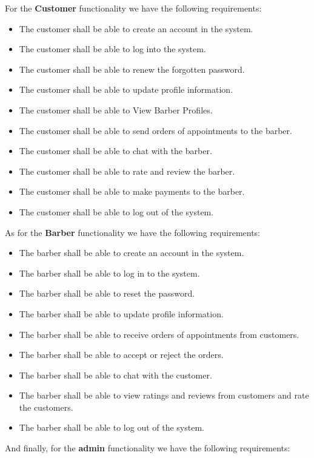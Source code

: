 \documentclass{article}
\begin{document}
      For the \textbf{Customer} functionality we have the following requirements:
      \begin{itemize}
        \item The customer shall be able to create an account in the system.
        \item The customer shall be able to log into the system.
        \item The customer shall be able to renew the forgotten password.
        \item The customer shall be able to update profile information.
        \item The customer shall be able to View Barber Profiles. 
        \item The customer shall be able to send orders of appointments to the barber. 
        \item The customer shall be able to chat with the barber. 
        \item The customer shall be able to rate and review the barber.
        \item The customer shall be able to make payments to the barber.
        \item The customer shall be able to log out of the system.  
      \end{itemize}      
       As for the \textbf{Barber} functionality we have the following requirements:
       \begin{itemize}
        \item The barber shall be able to create an account in the system.
        \item The barber shall be able to log in to the system. 
        \item The barber shall be able to reset the password.
        \item The barber shall be able to update profile information.
        \item The barber shall be able to receive orders of appointments from customers. 
        \item The barber shall be able to accept or reject the orders.
        \item The barber shall be able to chat with the customer. 
        \item The barber shall be able to view ratings and reviews from customers and rate the customers.
        \item The barber shall be able to log out of the system.
       \end{itemize}\pagebreak
       And finally, for the \textbf{admin} functionality we have the following requirements:
\end{document}
